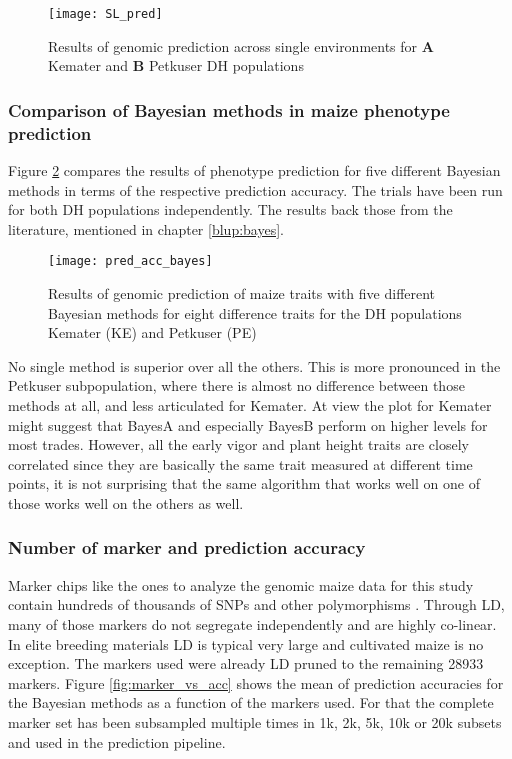 \begin{figure}[H]
 \centering \texttt{[image: SL\_pred]}
 \decoRule
 \caption[Results of genomic prediction across single environments for Kemater and
 Petkuser DH populations]{Results of genomic prediction across single environments for
   \textbf{A} Kemater and \textbf{B} Petkuser DH populations}
\label{fig:sl_pred}
\end{figure}

\subsubsection{Comparison of Bayesian methods in maize phenotype prediction}

Figure \ref{fig:bayes_vs_acc} compares the results of phenotype prediction for five
different Bayesian methods in terms of the respective prediction accuracy. The trials have
been run for both DH populations independently. The results back those from the
literature, mentioned in chapter \ref{blup:bayes}.

\begin{figure}[H]
 \centering \texttt{[image: pred\_acc\_bayes]}
 \decoRule
 \caption[Results of genomic prediction of maize traits with five different Bayesian
 methods]{Results of genomic prediction of maize traits with five different Bayesian
   methods for eight difference traits for the DH populations Kemater (KE) and Petkuser
   (PE)}
\label{fig:bayes_vs_acc}
\end{figure}

No single method is superior over all the others. This is more pronounced in the Petkuser
subpopulation, where there is almost no difference between those methods at all, and less
articulated for Kemater. At view the plot for Kemater might suggest that BayesA and
especially BayesB perform on higher levels for most trades. However, all the early vigor
and plant height traits are closely correlated since they are basically the same trait
measured at different time points, it is not surprising that the same algorithm that works
well on one of those works well on the others as well.

\subsubsection{Number of marker and prediction accuracy}

Marker chips like the ones to analyze the genomic maize data for this study contain hundreds of
thousands of SNPs and other polymorphisms \cite{unterseer2014powerful}. Through LD, many
of those markers do not segregate independently and are highly co-linear. In elite
breeding materials LD is typical very large and cultivated maize is no exception. The
markers used were already LD pruned to the remaining 28933 markers.  Figure
\ref{fig:marker_vs_acc} shows the mean of prediction accuracies for the Bayesian methods
as a function of the markers used. For that the complete marker set has been subsampled
multiple times in 1k, 2k, 5k, 10k or 20k subsets and used in the prediction pipeline.


